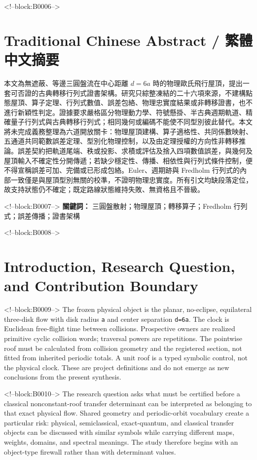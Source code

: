 \documentclass[11pt,a4paper]{article}
\begin{document}
<!--block:B0006-->
\begin{otherlanguage}{chinese-traditional}
\section*{Traditional Chinese Abstract / 繁體中文摘要}
本文為無遮蔽、等邊三圓盤流在中心距離 \(d=6a\) 時的物理歐氏飛行屋頂，提出一套可否證的古典轉移行列式證書架構。研究只綜整凍結的二十六項來源，不建構點態屋頂、算子定理、行列式數值、誤差包絡、物理忠實度結果或非轉移證書，也不進行新穎性判定。證據要求嚴格區分物理動力學、符號懸掛、半古典週期軌道、精確量子行列式與古典轉移行列式；相同幾何或編碼不能使不同型別彼此替代。本文將未完成義務整理為六道開放關卡：物理屋頂建構、算子適格性、共同係數映射、五通道共同範數誤差定理、型別化物理控制，以及由定理授權的方向性非轉移推論。誤差契約把軌道尾端、秩或投影、求積或評估及捨入四項數值誤差，與幾何及屋頂輸入不確定性分開傳遞；若缺少穩定性、傳播、相依性與行列式條件控制，便不得宣稱誤差可加、完備或已形成包絡。Euler、週期跡與 Fredholm 行列式的內部一致僅是與屋頂型別無關的校準，不證明物理忠實度。所有引文均缺段落定位，故支持狀態仍不確定；既定路線狀態維持失敗、無資格且不晉級。

<!--block:B0007-->
\noindent\textbf{關鍵詞：} 三圓盤散射；物理屋頂；轉移算子；Fredholm 行列式；誤差傳播；證書架構
\end{otherlanguage}

<!--block:B0008-->
\section{Introduction, Research Question, and Contribution Boundary}

<!--block:B0009-->
The frozen physical object is the planar, no-eclipse, equilateral three-disk flow with disk radius \texttt{a} and center separation \texttt{d=6a}. The clock is Euclidean free-flight time between collisions. Prospective owners are realized primitive cyclic collision words; traversal powers are repetitions. The pointwise roof must be calculated from collision geometry and the registered section, not fitted from inherited periodic totals. A unit roof is a typed symbolic control, not the physical clock. These are project definitions and do not emerge as new conclusions from the present synthesis.

<!--block:B0010-->
The research question asks what must be certified before a classical nonconstant-roof transfer determinant can be interpreted as belonging to that exact physical flow. Shared geometry and periodic-orbit vocabulary create a particular risk: physical, semiclassical, exact-quantum, and classical transfer objects can be discussed with similar symbols while carrying different maps, weights, domains, and spectral meanings. The study therefore begins with an object-type firewall rather than with determinant values.
\end{document}
